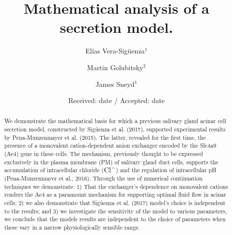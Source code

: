 \documentclass{svjour3}
\newcommand{\cl}{{\rm Cl}^-}
\begin{document}
\title{Mathematical analysis of a secretion model.}
\author{El{\'i}as Vera-Sig{\"u}enza$^1$ \and Martin Golubitsky$^2$ \and James Sneyd$^1$
}                     %
\date{Received: date / Accepted: date}
\maketitle
\begin{abstract}
{\color{red}We demonstrate the mathematical basis for which a previous salivary gland acinar cell secretion model, constructed by Sig{\"u}enza et al. (2017), supported experimental results by Pena-Munzenmayer et al. (2015). The latter, revealed for the first time, the presence of a monovalent cation-dependent anion exchanger encoded by the Slc4a9 (Ae4) gene in these cells. The mechanism, previously thought to be expressed exclusively in the plasma membrane (PM) of salivary gland duct cells, supports the accumulation of intracellular chloride ($\cl$) and the regulation of intracellular pH (Pena-Munzenmayer et al., 2016). Through the use of numerical continuation techniques we demonstrate: 1) That the exchanger's dependence on monovalent cations renders the Ae4 as a paramount mechanism for supporting optimal fluid flow in acinar cells; 2) we also demonstrate that Sig{\"u}enza et al. (2017) model's choice is independent to the results; and 3) we investigate the sensitivity of the model to various parameters, we conclude that the models results are independent to the choice of parameters when these vary in a narrow physiologically sensible range}. 
\end{abstract}
\clearpage
\end{document}
